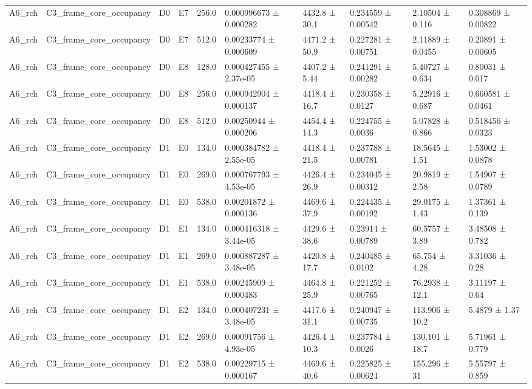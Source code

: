 \begin{table}
\begin{tabular}{llllllllll}
A6\_rch & C3\_frame\_core\_occupancy & D0 & E7 & 256.0 & 0.000996673 ± 0.000282 & 4432.8 ± 30.1 & 0.234559 ± 0.00542 & 2.10504 ± 0.116 & 0.308869 ± 0.00822 \\
A6\_rch & C3\_frame\_core\_occupancy & D0 & E7 & 512.0 & 0.00233774 ± 0.000609 & 4471.2 ± 50.9 & 0.227281 ± 0.00751 & 2.11889 ± 0.0455 & 0.20891 ± 0.00605 \\
A6\_rch & C3\_frame\_core\_occupancy & D0 & E8 & 128.0 & 0.000427455 ± 2.37e-05 & 4407.2 ± 5.44 & 0.241291 ± 0.00282 & 5.40727 ± 0.634 & 0.80031 ± 0.017 \\
A6\_rch & C3\_frame\_core\_occupancy & D0 & E8 & 256.0 & 0.000942904 ± 0.000137 & 4418.4 ± 16.7 & 0.230358 ± 0.0127 & 5.22916 ± 0.687 & 0.660581 ± 0.0461 \\
A6\_rch & C3\_frame\_core\_occupancy & D0 & E8 & 512.0 & 0.00250944 ± 0.000206 & 4454.4 ± 14.3 & 0.224755 ± 0.0036 & 5.07828 ± 0.866 & 0.518456 ± 0.0323 \\
A6\_rch & C3\_frame\_core\_occupancy & D1 & E0 & 134.0 & 0.000384782 ± 2.55e-05 & 4418.4 ± 21.5 & 0.237788 ± 0.00781 & 18.5645 ± 1.51 & 1.53002 ± 0.0878 \\
A6\_rch & C3\_frame\_core\_occupancy & D1 & E0 & 269.0 & 0.000767793 ± 4.53e-05 & 4426.4 ± 26.9 & 0.234045 ± 0.00312 & 20.9819 ± 2.58 & 1.54907 ± 0.0789 \\
A6\_rch & C3\_frame\_core\_occupancy & D1 & E0 & 538.0 & 0.00201872 ± 0.000136 & 4469.6 ± 37.9 & 0.224435 ± 0.00192 & 29.0175 ± 1.43 & 1.37361 ± 0.139 \\
A6\_rch & C3\_frame\_core\_occupancy & D1 & E1 & 134.0 & 0.000416318 ± 3.44e-05 & 4429.6 ± 38.6 & 0.23914 ± 0.00789 & 60.5757 ± 3.89 & 3.48508 ± 0.782 \\
A6\_rch & C3\_frame\_core\_occupancy & D1 & E1 & 269.0 & 0.000887287 ± 3.48e-05 & 4420.8 ± 17.7 & 0.240485 ± 0.0102 & 65.754 ± 4.28 & 3.31036 ± 0.28 \\
A6\_rch & C3\_frame\_core\_occupancy & D1 & E1 & 538.0 & 0.00245909 ± 0.000483 & 4464.8 ± 25.9 & 0.221252 ± 0.00765 & 76.2938 ± 12.1 & 3.11197 ± 0.64 \\
A6\_rch & C3\_frame\_core\_occupancy & D1 & E2 & 134.0 & 0.000407231 ± 3.48e-05 & 4417.6 ± 31.1 & 0.240947 ± 0.00735 & 113.906 ± 10.2 & 5.4879 ± 1.37 \\
A6\_rch & C3\_frame\_core\_occupancy & D1 & E2 & 269.0 & 0.00091756 ± 4.93e-05 & 4426.4 ± 10.3 & 0.237784 ± 0.0026 & 130.101 ± 18.7 & 5.71961 ± 0.779 \\
A6\_rch & C3\_frame\_core\_occupancy & D1 & E2 & 538.0 & 0.00229715 ± 0.000167 & 4469.6 ± 40.6 & 0.225825 ± 0.00624 & 155.296 ± 31 & 5.55797 ± 0.859 \\

\end{tabular}
\end{table}
